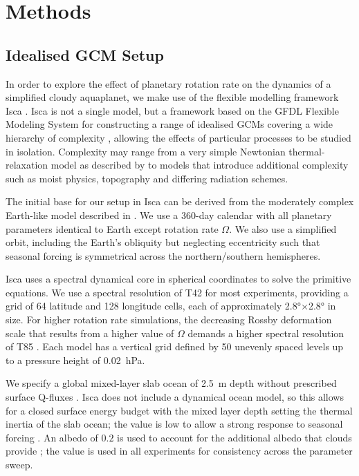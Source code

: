 \section{Methods}\label{sec:methods}


\subsection{Idealised GCM Setup}
In order to explore the effect of planetary rotation rate on the dynamics of a simplified cloudy aquaplanet, we make use of the flexible modelling framework Isca \citep{vallis2018-Isca}. Isca is not a single model, but a framework based on the GFDL Flexible Modeling System for constructing a range of idealised GCMs covering a wide hierarchy of complexity \citep{thomson2019-Hierarchical}, allowing the effects of particular processes to be studied in isolation. Complexity may range from a very simple Newtonian thermal-relaxation model as described by \citet{held1994-Proposal} to models that introduce additional complexity such as moist physics, topography and differing radiation schemes. 

The initial base for our setup in Isca can be derived from the moderately complex Earth-like model described in \citet{thomson2019-Hierarchical}. We use a 360-day calendar with all planetary parameters identical to Earth except rotation rate $\Omega$. We also use a simplified orbit, including the Earth's obliquity but neglecting eccentricity such that seasonal forcing is symmetrical across the northern/southern hemispheres.

Isca uses a spectral dynamical core in spherical coordinates to solve the primitive equations. We use a spectral resolution of T42 for most experiments, providing a grid of 64 latitude and 128 longitude cells, each of approximately \ang{2.8}$\times$\ang{2.8} in size. For higher rotation rate simulations, the decreasing Rossby deformation scale that results from a higher value of $\Omega$ demands a higher spectral resolution of T85 \citep{kaspi2015-ATMOSPHERIC, vallis2017-Atmospheric}. Each model has a vertical grid defined by 50 unevenly spaced levels up to a pressure height of \SI{0.02}{\hecto\Pa}. 

We specify a global mixed-layer slab ocean of \SI{2.5}{\m} depth without prescribed surface Q-fluxes \citep{jucker2017-Untangling}. Isca does not include a dynamical ocean model, so this allows for a closed surface energy budget with the mixed layer depth setting the thermal inertia of the slab ocean; the value is low to allow a strong response to seasonal forcing \citep{donohoe2014-Effect, jucker2019-SURFACE, liu2021-SimCloud}. An albedo of $0.2$ is used to account for the additional albedo that clouds provide \citep{liu2021-SimCloud}; the value is used in all experiments for consistency across the parameter sweep.

